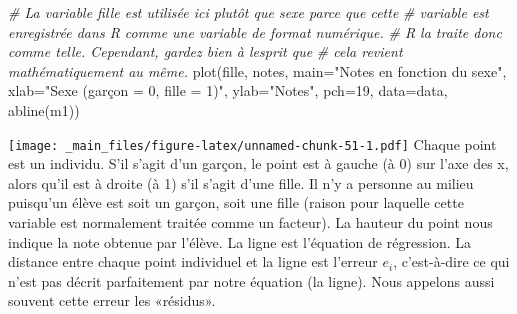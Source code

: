 \documentclass[
]{book}
\newenvironment{Shaded}{\begin{snugshade}}{\end{snugshade}}
\newcommand{\AttributeTok}[1]{\textcolor[rgb]{0.77,0.63,0.00}{#1}}
\newcommand{\CommentTok}[1]{\textcolor[rgb]{0.56,0.35,0.01}{\textit{#1}}}
\newcommand{\DecValTok}[1]{\textcolor[rgb]{0.00,0.00,0.81}{#1}}
\newcommand{\FunctionTok}[1]{\textcolor[rgb]{0.00,0.00,0.00}{#1}}
\newcommand{\NormalTok}[1]{#1}
\newcommand{\StringTok}[1]{\textcolor[rgb]{0.31,0.60,0.02}{#1}}
\begin{document}
\begin{Shaded}
\begin{Highlighting}[]
\CommentTok{\# La variable fille est utilisée ici plutôt que sexe parce que cette }
\CommentTok{\# variable est enregistrée dans R comme une variable de format numérique.}
\CommentTok{\# R la traite donc comme telle. Cependant, gardez bien à l\textquotesingle{}esprit que }
\CommentTok{\# cela revient mathématiquement au même. }
\FunctionTok{plot}\NormalTok{(fille, notes, }\AttributeTok{main=}\StringTok{"Notes en fonction du sexe"}\NormalTok{, }
    \AttributeTok{xlab=}\StringTok{"Sexe (garçon = 0, fille = 1)"}\NormalTok{, }\AttributeTok{ylab=}\StringTok{"Notes"}\NormalTok{, }\AttributeTok{pch=}\DecValTok{19}\NormalTok{, }\AttributeTok{data=}\NormalTok{data,}
    \FunctionTok{abline}\NormalTok{(m1))}
\end{Highlighting}
\end{Shaded}

\texttt{[image: \_main\_files/figure-latex/unnamed-chunk-51-1.pdf]}
Chaque point est un individu. S'il s'agit d'un garçon, le point est à gauche (à 0) sur l'axe des x, alors qu'il est à droite (à 1) s'il s'agit d'une fille. Il n'y a personne au milieu puisqu'un élève est soit un garçon, soit une fille (raison pour laquelle cette variable est normalement traitée comme un facteur). La hauteur du point nous indique la note obtenue par l'élève. La ligne est l'équation de régression. La distance entre chaque point individuel et la ligne est l'erreur \(e_i\), c'est-à-dire ce qui n'est pas décrit parfaitement par notre équation (la ligne). Nous appelons aussi souvent cette erreur les «résidus».
\end{document}
